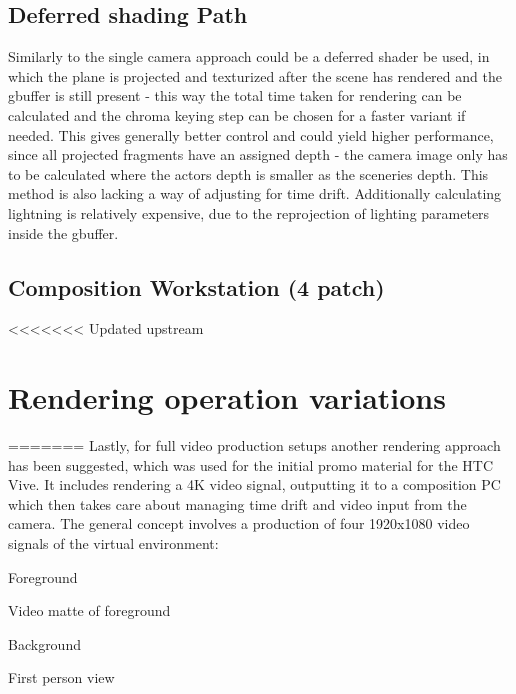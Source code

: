 \subsection{Deferred shading Path}

Similarly to the single camera approach could be a deferred shader be used, in 
which the plane is projected and texturized after the scene has rendered and 
the gbuffer is still present - this way the total time taken for rendering can 
be calculated and the chroma keying step can be chosen for a faster variant if 
needed. This gives generally better control and could yield higher performance, 
since all projected fragments have an assigned depth - the camera image only 
has to be calculated where the actors depth is smaller as the sceneries depth.
This method is also lacking a way of adjusting for time drift. Additionally 
calculating lightning is relatively expensive, due to the reprojection of 
lighting parameters inside the gbuffer.

\subsection{Composition Workstation (4 patch)}

<<<<<<< Updated upstream
\section{Rendering operation variations}
=======
Lastly, for full video production setups another rendering approach has been 
suggested, which was used for the initial promo material for the HTC Vive. It 
includes rendering a 4K video signal, outputting it to a composition PC which 
then takes care about managing time drift and video input from the camera.
\newline
The general concept involves a production of four 1920x1080 video signals of 
the virtual environment:
\begin{my_list}
	\item Foreground
	\item Video matte of foreground
	\item Background
	\item First person view
\end{my_list}

